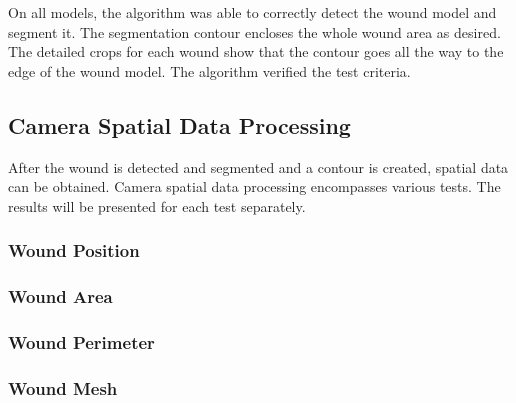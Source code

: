 On all models, the algorithm was able to correctly detect the wound model and segment it. The segmentation contour encloses the whole wound area as desired. The detailed crops for each wound show that the contour goes all the way to the edge of the wound model. The algorithm verified the test criteria.


\subsection{Camera Spatial Data Processing}
\label{subsec:simulated_system_results_camera_spatial_data_processing}

After the wound is detected and segmented and a contour is created, spatial data can be obtained. Camera spatial data processing encompasses various tests. The results will be presented for each test separately.

\subsubsection*{Wound Position}
\label{subsubsec:simulated_system_results_camera_spatial_data_processing_position}


\subsubsection*{Wound Area}
\label{subsubsec:simulated_system_results_camera_spatial_data_processing_area}


\subsubsection*{Wound Perimeter}
\label{subsubsec:simulated_system_results_camera_spatial_data_processing_perimeter}


\subsubsection*{Wound Mesh}
\label{subsubsec:simulated_system_results_camera_spatial_data_processing_mesh}

